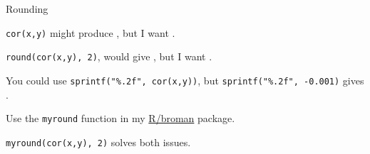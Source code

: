 \documentclass[aspectratio=169,12pt,t]{beamer}
\begin{document}
\begin{frame}{Rounding}

\vspace{24pt}

\bi
\itemsep18pt
\item {\tt cor(x,y)} might produce {\tt {}}, but
I want {\tt {}}.

\item {\tt round(cor(x,y), 2)}, would give {\tt {}}, but I want
{\tt {}}.

\item You could use {\tt sprintf("\%.2f", cor(x,y))}, but
{\tt sprintf("\%.2f", -0.001)} gives {\tt {}}.

\item Use the {\tt myround} function in my
\href{https://github.com/kbroman/broman}{R/broman} package.

\item {\tt myround(cor(x,y), 2)} solves both issues.
\ei

\end{frame}
\end{document}
